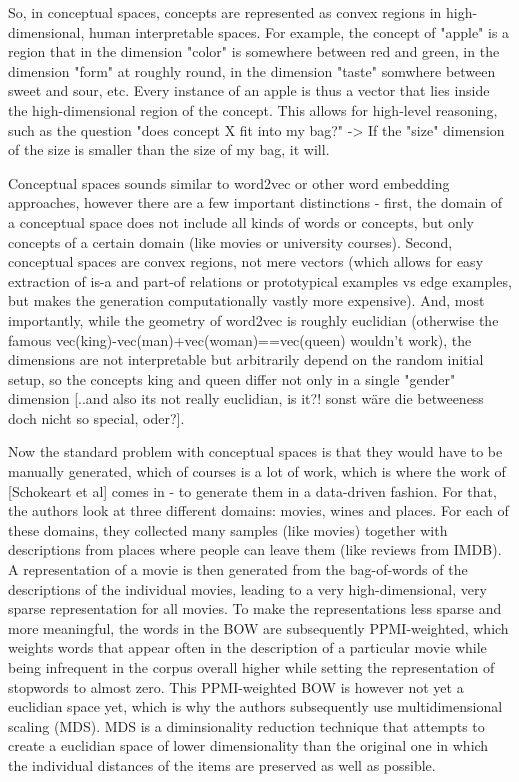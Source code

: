 \documentclass[11pt,
  paper=a4, 
  bibliography=totocnumbered,
	captions=tableheading,
	BCOR=10mm
]{scrreprt}
\theoremstyle{definition}
\begin{document}
So, in conceptual spaces, concepts are represented as convex regions in high-dimensional, human interpretable spaces. For example, the concept of "apple" is a region that in the dimension "color" is somewhere between red and green, in the dimension "form" at roughly round, in the dimension "taste" somwhere between sweet and sour, etc. 
Every instance of an apple is thus a vector that lies inside the high-dimensional region of the concept. This allows for high-level reasoning, such as the question "does concept X fit into my bag?" -> If the "size" dimension of the size is smaller than the size of my bag, it will.

Conceptual spaces sounds similar to word2vec or other word embedding approaches, however there are a few important distinctions - first, the domain of a conceptual space does not include all kinds of words or concepts, but only concepts of a certain domain (like movies or university courses). 
Second, conceptual spaces are convex regions, not mere vectors (which allows for easy extraction of is-a and part-of relations or prototypical examples vs edge examples, but makes the generation computationally vastly more expensive). And, most importantly, while the geometry of word2vec is roughly euclidian (otherwise the famous vec(king)-vec(man)+vec(woman)==vec(queen) wouldn't work), the dimensions are not interpretable but arbitrarily depend on the random initial setup, so the concepts king and queen differ not only in a single "gender" dimension [..and also its not really euclidian, is it?! sonst wäre die betweeness doch nicht so special, oder?].

Now the standard problem with conceptual spaces is that they would have to be manually generated, which of courses is a lot of work, which is where the work of [Schokeart et al] comes in - to generate them in a data-driven fashion.
For that, the authors look at three different domains: movies, wines and places. For each of these domains, they collected many samples (like movies) together with descriptions from places where people can leave them (like reviews from IMDB). A representation of a movie is then generated from the bag-of-words of the descriptions of the individual movies, leading to a very high-dimensional, very sparse representation for all movies. 
To make the representations less sparse and more meaningful, the words in the BOW are subsequently PPMI-weighted, which weights words that appear often in the description of a particular movie while being infrequent in the corpus overall higher while setting the representation of stopwords to almost zero. 
This PPMI-weighted BOW is however not yet a euclidian space yet, which is why the authors subsequently use multidimensional scaling (MDS). MDS is a diminsionality reduction technique that attempts to create a euclidian space of lower dimensionality than the original one in which the individual distances of the items are preserved as well as possible. 
\end{document}
